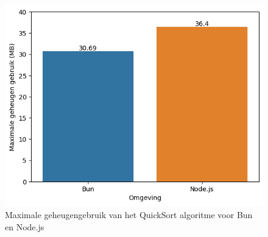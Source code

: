 \begin{figure}[H]
  \centering
  \includegraphics{graphics/RAMScript.png}
  \caption[Geheugengebruik QuickSort algoritme]{\label{fig:RAMscript}Maximale geheugengebruik van het QuickSort algoritme voor Bun en Node.js}
\end{figure}

